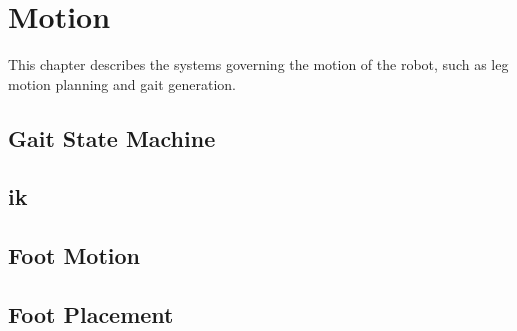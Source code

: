 \chapter{Motion}
This chapter describes the systems governing the motion of the robot, such as leg motion planning and gait generation.
\section{Gait State Machine}
\section{\acf{ik}}
\section{Foot Motion}
\section{Foot Placement}